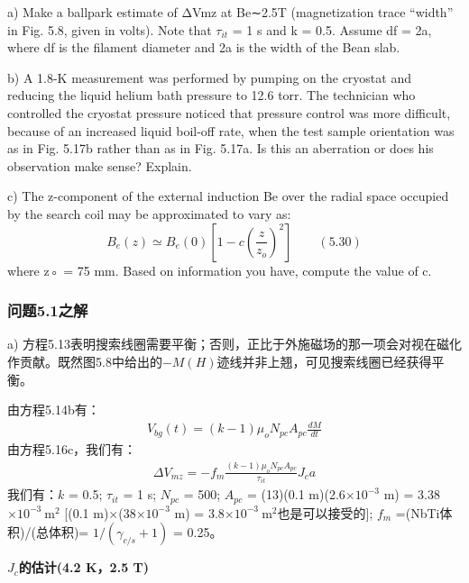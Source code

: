 a) Make a ballpark estimate of ΔVmz at Be∼2.5T (magnetization trace “width”
in Fig. 5.8, given in volts). Note that $\tau_{it}$ = 1 s and k = 0.5. Assume df = 2a,
where df is the filament diameter and 2a is the width of the Bean slab.

b) A 1.8-K measurement was performed by pumping on the cryostat and reducing
the liquid helium bath pressure to 12.6 torr. The technician who controlled
the cryostat pressure noticed that pressure control was more difficult,
because of an increased liquid boil-off rate, when the test sample orientation
was as in Fig. 5.17b rather than as in Fig. 5.17a. Is this an aberration or
does his observation make sense? Explain.

c) The z-component of the external induction Be over the radial space occupied
by the search coil may be approximated to vary as:
\begin{equation}%
B_{e}(z)\simeq B_{e}(0)[1-c(\frac{z}{z_{o}})^{2}]\qquad(5.30)
\end{equation}
where z◦ = 75 mm. Based on information you have, compute the value of c.

\subsubsection{问题5.1之解}
a) 方程5.13表明搜索线圈需要平衡；否则，正比于外施磁场的那一项会对视在磁化作贡献。既然图5.8中给出的$−M(H)$迹线并非上翘，可见搜索线圈已经获得平衡。

由方程5.14b有：
\begin{align*}%
V_{bg}(t)=(k-1)\mu_{o}N_{pc}A_{pc}\frac{dM}{dt}\tag{5.14b}
\end{align*}
由方程5.16c，我们有：
\begin{align*}%
\Delta V_{mz}=-f_{m}\frac{(k-1)\mu_{o}N_{pc}A_{pc}}{\tau_{it}}J_{c}a\tag{5.16c}
\end{align*}
我们有：$k$ = 0.5; $\tau_{it}$ = 1 s; $N_{pc}$ = 500; $A_{pc}$ = (13)(0.1 m)(2.6$\times 10^{−3}$ m) = 3.38$\times 10^{−3}\ \mathrm{m^2}$ 
[(0.1 m)$\times$(38$\times 10^{−3}$ m) = 3.8$\times 10^{−3}\ \mathrm{m^2}$也是可以接受的]; $f_m$ =(NbTi体积)/(总体积)= $1/(\gamma_{c/s} + 1)$ = 0.25。

\textbf{$J_c$的估计(4.2 K，2.5 T)}

